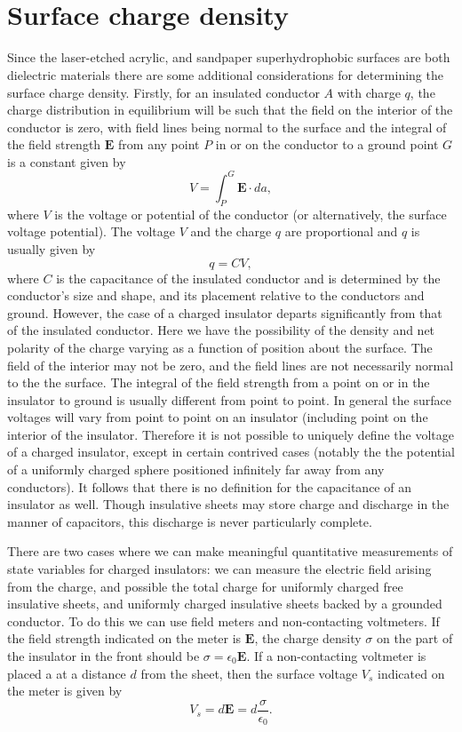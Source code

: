 \documentclass{jfm}
\begin{document}
\section{\\Surface charge density}
Since the laser-etched acrylic, and sandpaper superhydrophobic surfaces are both dielectric materials there are some additional considerations for determining the surface charge density. Firstly, for an insulated conductor $A$ with charge $q$, the charge distribution in equilibrium will be such that the field on the interior of the conductor is zero, with field lines being normal to the surface and the integral of the field strength $\mathbf{E}$ from any point $P$ in or on the conductor to a ground point $G$ is a constant given by
\[ V = \int^G_P \mathbf{E} \cdot da, \]
where $V$ is the voltage or potential of the conductor (or alternatively, the surface voltage potential). The voltage $V$ and the charge $q$ are proportional and $q$ is usually given by
\[q = CV, \]
where $C$ is the capacitance of the insulated conductor and is determined by the conductor's size and shape, and its placement relative to the conductors and ground. However, the case of a charged insulator departs significantly from that of the insulated conductor. Here we have the possibility of the density and net polarity of the charge varying as a function of position about the surface. The field of the interior may not be zero, and the field lines are not necessarily normal to the the surface. The integral of the field strength from a point on or in the insulator to ground is usually different from point to point. In general the surface voltages will vary from point to point on an insulator (including point on the interior of the insulator. Therefore it is not possible to uniquely define the voltage of a charged insulator, except in certain contrived cases (notably the the potential of a uniformly charged sphere positioned infinitely far away from any conductors). It follows that there is no definition for the capacitance of an insulator as well. Though insulative sheets may store charge and discharge in the manner of capacitors, this discharge is never particularly complete.

There are two cases where we can make meaningful quantitative measurements of state variables for charged insulators: we can measure the electric field arising from the charge, and possible the total charge for uniformly charged free insulative sheets, and uniformly charged insulative sheets backed by a grounded conductor. To do this we can use field meters and non-contacting voltmeters. If the field strength indicated on the meter is $\mathbf{E}$, the charge density $\sigma$ on the part of the insulator in the front should be $\sigma = \epsilon_0 \mathbf{E}$. If a non-contacting voltmeter is placed a at a distance $d$ from the sheet, then the surface voltage $V_s$ indicated on the meter is given by 
\[V_s = d \mathbf{E} = d \frac{\sigma}{\epsilon_0}. \]
\end{document}

